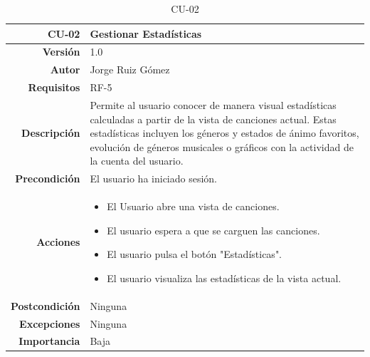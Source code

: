 \begin{table}[H]
    \centering
    \begin{tabular}{r|p{}}
    \hline
    \textbf{CU-02}         & \textbf{Gestionar Estadísticas}                                 \\ \hline
    \textbf{Versión}       & 1.0                                                     \\
    \textbf{Autor}         & Jorge Ruiz Gómez                                        \\
    \textbf{Requisitos}    & RF-5                                         \\
    \textbf{Descripción}   & Permite al usuario conocer de manera visual estadísticas calculadas a partir de la vista de canciones actual. Estas estadísticas incluyen los géneros y estados de ánimo favoritos, evolución de géneros musicales o gráficos con la actividad de la cuenta del usuario.  \\ \hline
    \textbf{Precondición}  & El usuario ha iniciado sesión.                                              \\
    \textbf{Acciones}      &    \begin{itemize}
                                    \item El Usuario abre una vista de canciones.
                                    \item El usuario espera a que se carguen las canciones.
                                    
                                    \item El usuario pulsa el botón "Estadísticas".
                                    \item El usuario visualiza las estadísticas de la vista actual.
    
                                \end{itemize}\\
                                                                              
    \textbf{Postcondición} & Ninguna                              \\
    \textbf{Excepciones}   & Ninguna                                                 \\
    \textbf{Importancia}   & Baja                                                    \\ \hline
    \end{tabular}
    \caption{CU-02}
    \label{tab:CUT-02}
\end{table}

